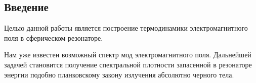 %
%
%
%
%
%

\subsection*{Введение}

    Целью данной работы является построение термодинамики электромагнитного поля в сферическом резонаторе.

    Нам уже известен возможный спектр мод электромагнитного поля. Дальнейшей задачей становится получение спектральной плотности запасенной в резонаторе энергии подобно планковскому закону излучения абсолютно черного тела.
